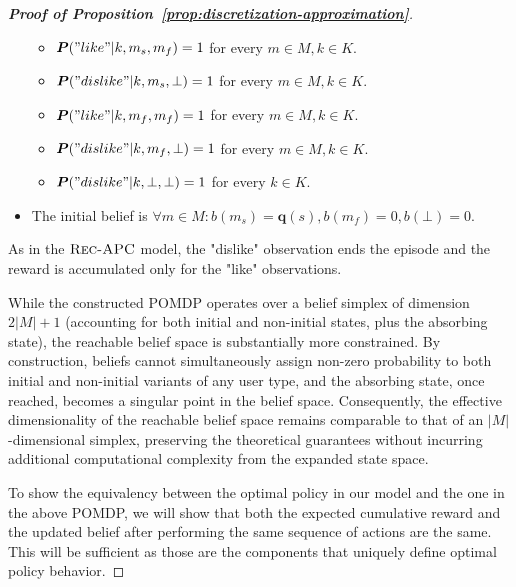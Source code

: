 \begin{proof}[\normalfont\bfseries Proof of Proposition~\ref{prop:discretization-approximation}]
\begin{itemize}
\begin{itemize}
            \item $\bm{P}("like" | k, m_{s}, m_{f}) = 1$ for every $m \in M, k \in K$.
            \item $\bm{P}("dislike" | k, m_{s}, \bot) = 1$ for every $m \in M, k \in K$.
            \item $\bm{P}("like" | k, m_{f}, m_{f}) = 1$ for every $m \in M, k \in K$.
            \item $\bm{P}("dislike" | k, m_{f}, \bot) = 1$ for every $m \in M, k \in K$.
            \item $\bm{P}("dislike" | k, \bot, \bot) = 1$ for every $k \in K$.
          \end{itemize}
    \item The initial belief is $\forall m \in M: b(m_s) = \bm{q}(s), b(m_f) = 0, b(\bot)=0$.
  \end{itemize}

  As in the $\textsc{Rec-APC}$ model, the "dislike" observation ends the episode and the reward is accumulated only for the "like" observations.

  While the constructed POMDP operates over a belief simplex of dimension $2|M|+1$ (accounting for both initial and non-initial states, plus the absorbing state), the reachable belief space is substantially more constrained. By construction, beliefs cannot simultaneously assign non-zero probability to both initial and non-initial variants of any user type, and the absorbing state, once reached, becomes a singular point in the belief space. Consequently, the effective dimensionality of the reachable belief space remains comparable to that of an $|M|$-dimensional simplex, preserving the theoretical guarantees without incurring additional computational complexity from the expanded state space.

  To show the equivalency between the optimal policy in our model and the one in the above POMDP, we will show that both the expected cumulative reward and the updated belief after performing the same sequence of actions are the same. This will be sufficient as those are the components that uniquely define optimal policy behavior.


\end{proof}
